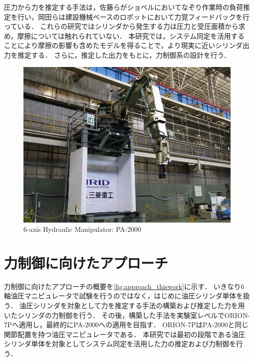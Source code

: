 圧力から力を推定する手法は，佐藤ら\cite{佐藤有香理2015油圧ショベルにおけるバケット先端の負荷力推定}がショベルにおいてなぞり作業時の負荷推定を行い，岡田ら\cite{岡田大貴2016多自由度油圧駆動ロボットのシリンダ圧に基づく手先負荷力推定,岡田大貴2017多自由度油圧駆動ロボットのシリンダ圧に基づく手先負荷力推定による力覚フィードバック}は建設機械ベースのロボットにおいて力覚フィードバックを行っている．
これらの研究ではシリンダから発生する力は圧力と受圧面積から求め，摩擦については触れられていない．
本研究では，システム同定を活用することにより摩擦の影響も含めたモデルを得ることで，より現実に近いシリンダ出力を推定する．
さらに，推定した出力をもとに，力制御系の設計を行う．

\begin{figure}[t]
    \centering
        \includegraphics[keepaspectratio, width = .8\linewidth]{contents/緒言/figure/PA-2000.jpg}
        \caption{6-axis Hydraulic Manipulator: PA-2000}
        \label{fig:PA-2000}
\end{figure}

\section{力制御に向けたアプローチ}
力制御に向けたアプローチの概要を\figname\ref{fig:approach_thiswork}に示す．
いきなり6軸油圧マニピュレータで試験を行うのではなく，はじめに油圧シリンダ単体を扱う．
油圧シリンダを対象として力を推定する手法の構築および推定した力を用いたシリンダの力制御を行う．
その後，構築した手法を実験室レベルでORION-7Pへ適用し，最終的にPA-2000への適用を目指す．
ORION-7PはPA-2000と同じ関節配置を持つ油圧マニピュレータである．
本研究では最初の段階である油圧シリンダ単体を対象としてシステム同定を活用した力の推定および力制御を行う．

